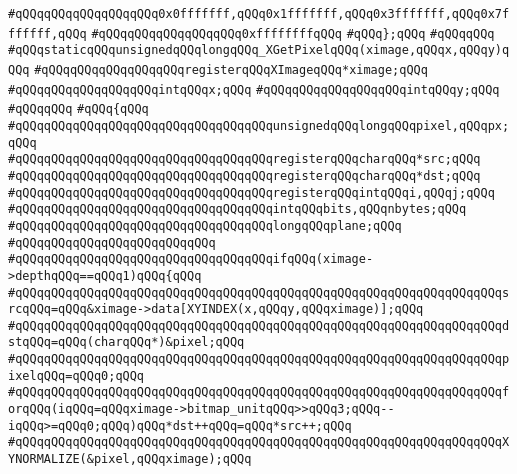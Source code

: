 \verb|#qQQqqQQqqQQqqQQqqQQq0x0fffffff,qQQq0x1fffffff,qQQq0x3fffffff,qQQq0x7fffffff,qQQq|\newline
\verb|#qQQqqQQqqQQqqQQqqQQq0xffffffffqQQq|\newline
\verb|#qQQq};qQQq|\newline
\verb|#qQQqqQQq|\newline
\verb|#qQQqstaticqQQqunsignedqQQqlongqQQq_XGetPixelqQQq(ximage,qQQqx,qQQqy)qQQq|\newline
\verb|#qQQqqQQqqQQqqQQqqQQqregisterqQQqXImageqQQq*ximage;qQQq|\newline
\verb|#qQQqqQQqqQQqqQQqqQQqintqQQqx;qQQq|\newline
\verb|#qQQqqQQqqQQqqQQqqQQqintqQQqy;qQQq|\newline
\verb|#qQQqqQQq|\newline
\verb|#qQQq{qQQq|\newline
\verb|#qQQqqQQqqQQqqQQqqQQqqQQqqQQqqQQqqQQqunsignedqQQqlongqQQqpixel,qQQqpx;qQQq|\newline
\verb|#qQQqqQQqqQQqqQQqqQQqqQQqqQQqqQQqqQQqregisterqQQqcharqQQq*src;qQQq|\newline
\verb|#qQQqqQQqqQQqqQQqqQQqqQQqqQQqqQQqqQQqregisterqQQqcharqQQq*dst;qQQq|\newline
\verb|#qQQqqQQqqQQqqQQqqQQqqQQqqQQqqQQqqQQqregisterqQQqintqQQqi,qQQqj;qQQq|\newline
\verb|#qQQqqQQqqQQqqQQqqQQqqQQqqQQqqQQqqQQqintqQQqbits,qQQqnbytes;qQQq|\newline
\verb|#qQQqqQQqqQQqqQQqqQQqqQQqqQQqqQQqqQQqlongqQQqplane;qQQq|\newline
\verb|#qQQqqQQqqQQqqQQqqQQqqQQqqQQq|\newline
\verb|#qQQqqQQqqQQqqQQqqQQqqQQqqQQqqQQqqQQqifqQQq(ximage->depthqQQq==qQQq1)qQQq{qQQq|\newline
\verb|#qQQqqQQqqQQqqQQqqQQqqQQqqQQqqQQqqQQqqQQqqQQqqQQqqQQqqQQqqQQqqQQqqQQqsrcqQQq=qQQq&ximage->data[XYINDEX(x,qQQqy,qQQqximage)];qQQq|\newline
\verb|#qQQqqQQqqQQqqQQqqQQqqQQqqQQqqQQqqQQqqQQqqQQqqQQqqQQqqQQqqQQqqQQqqQQqdstqQQq=qQQq(charqQQq*)&pixel;qQQq|\newline
\verb|#qQQqqQQqqQQqqQQqqQQqqQQqqQQqqQQqqQQqqQQqqQQqqQQqqQQqqQQqqQQqqQQqqQQqpixelqQQq=qQQq0;qQQq|\newline
\verb|#qQQqqQQqqQQqqQQqqQQqqQQqqQQqqQQqqQQqqQQqqQQqqQQqqQQqqQQqqQQqqQQqqQQqforqQQq(iqQQq=qQQqximage->bitmap_unitqQQq>>qQQq3;qQQq--iqQQq>=qQQq0;qQQq)qQQq*dst++qQQq=qQQq*src++;qQQq|\newline
\verb|#qQQqqQQqqQQqqQQqqQQqqQQqqQQqqQQqqQQqqQQqqQQqqQQqqQQqqQQqqQQqqQQqqQQqXYNORMALIZE(&pixel,qQQqximage);qQQq|\newline
